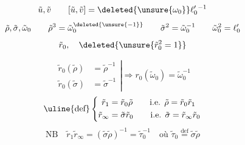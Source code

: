 \[
\tilde u,\tilde v\qquad
[\tilde u,\tilde v]=\deleted{\unsure{\omega_0}}\ell_0'{}^{-1}
\]
\[
\tilde\rho,\tilde\sigma,\tilde\omega_0\qquad
\tilde\rho^3=\tilde\omega_0^{\deleted{\unsure{-1}}}
\qquad
\tilde\sigma^2=\tilde\omega_0^{-1}
\qquad
\tilde\omega_0^2=\ell'_0
\]
\[
\tilde r_0,\quad\deleted{\unsure{\tilde r_0^2=1}}
\]


\[
\left.\begin{aligned}
\tilde r_0(\tilde\rho)&=\tilde\rho^{-1}\\
\tilde r_0(\tilde\sigma)&=\tilde\sigma^{-1}
\end{aligned}\right|\Longrightarrow r_0(\tilde\omega_0)=\tilde\omega_0^{-1}
\]
\[
\uline{\text{def}}\left\{\begin{aligned}
\tilde r_1&=\tilde r_0\tilde\rho\qquad\text{i.e. }\tilde\rho=\tilde r_0\tilde r_1\\
\tilde r_\infty&=\tilde\sigma\tilde r_0\qquad\text{i.e. }\tilde\sigma=\tilde r_\infty\tilde r_0
\end{aligned}\right.
\]
\[
\text{NB}\quad\tilde r_1\tilde r_\infty=(\tilde\sigma\tilde\rho)^{-1}=\tilde\tau_0^{-1}
\quad\text{où }\tilde\tau_0\overset{\mathrm{def}}=\tilde\sigma\tilde\rho
\]

